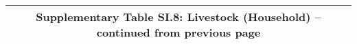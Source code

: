 \begin{longtable}{llcccccccccc}
\multicolumn{12}{c}{{\bfseries Supplementary Table SI.8: Livestock (Household) -- continued from previous page}} \\ \hline                                                                                                                                                                                                                                                                                                                                                                                                                                                                                                                                                                                                                                                                                                                                                                

\end{longtable}
